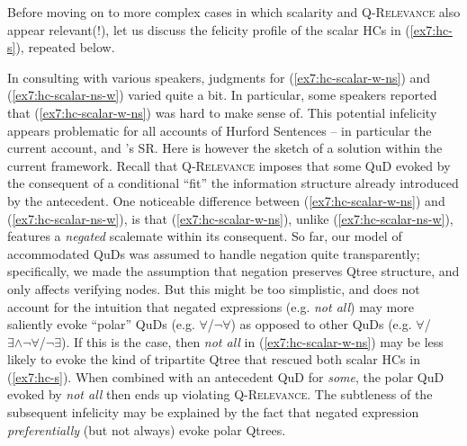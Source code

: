 Before moving on to more complex cases in which scalarity and \textsc{Q-Relevance} also appear relevant(!), let us discuss the felicity profile of the scalar HCs in (\ref{ex7:hc-s}), repeated below.

\begin{exe}
	\begin{xlist}
	\end{xlist}
\end{exe}

In consulting with various speakers, judgments for (\ref{ex7:hc-scalar-w-ns}) and (\ref{ex7:hc-scalar-ns-w}) varied quite a bit. In particular, some speakers reported that (\ref{ex7:hc-scalar-w-ns}) was hard to make sense of. This potential infelicity appears problematic for all accounts of Hurford Sentences -- in particular the current account, and \citet{Kalomoiros2024}'s SR. Here is however the sketch of a solution within the current framework. Recall that \textsc{Q-Relevance} imposes that some QuD evoked by the consequent of a conditional ``fit'' the information structure already introduced by the antecedent. One noticeable difference between (\ref{ex7:hc-scalar-w-ns}) and (\ref{ex7:hc-scalar-ns-w}), is that (\ref{ex7:hc-scalar-w-ns}), unlike (\ref{ex7:hc-scalar-ns-w}), features a \textit{negated} scalemate within its consequent. So far, our model of accommodated QuDs was assumed to handle negation quite transparently; specifically, we made the assumption that negation preserves Qtree structure, and only affects verifying nodes. But this might be too simplistic, and does not account for the intuition that negated expressions (e.g. \textit{not all}) may more saliently evoke ``polar'' QuDs (e.g. $\forall$/$\neg\forall$) as opposed to other QuDs (e.g. $\forall$/$\exists\wedge\neg\forall$/$\neg\exists$). If this is the case, then \textit{not all} in (\ref{ex7:hc-scalar-w-ns}) may be less likely to evoke the kind of tripartite Qtree that rescued both scalar HCs in (\ref{ex7:hc-s}). When combined with an antecedent QuD for \textit{some}, the polar QuD evoked by \textit{not all} then ends up violating \textsc{Q-Relevance}. The subtleness of the subsequent infelicity may be explained by the fact that negated expression \textit{preferentially} (but not always) evoke polar Qtrees.\\


